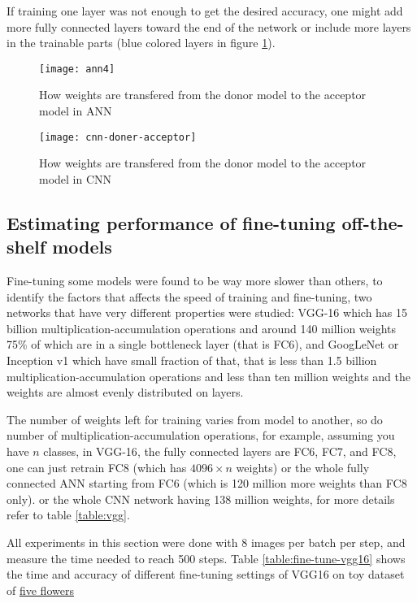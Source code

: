 If training one layer was not enough to get the desired accuracy,
one might add more fully connected layers toward the end of the network
or include more layers in the trainable parts (blue colored layers in figure \ref{fig:ann4}).

\begin{figure}[!h]
\centering
\texttt{[image: ann4]}
\caption{How weights are transfered from the donor model to the acceptor model in ANN}\label{fig:ann4}
\end{figure}


\begin{figure}[!h]
\centering
\texttt{[image: cnn-doner-acceptor]}
\caption{How weights are transfered from the donor model to the acceptor model in CNN}\label{fig:cnn-doner-acceptor}
\end{figure}

\subsection{Estimating performance of fine-tuning off-the-shelf models}


Fine-tuning some models were found to be way more slower than others,
to identify the factors that affects the speed of training and fine-tuning,
two networks that have very different properties were studied:
VGG-16\autocite{simonyan2014very} which has 15 billion multiplication-accumulation operations and around 140 million weights
75\% of which are in a single bottleneck layer (that is FC6), 
and GoogLeNet or Inception v1\autocite{szegedy2015going} which have small fraction of that, that is
less than 1.5 billion multiplication-accumulation operations and less than ten million weights
and the weights are almost evenly distributed on layers.

The number of weights left for training varies from model to another,
so do number of multiplication-accumulation operations, for example,
assuming you have \(n\) classes, in VGG-16\autocite{simonyan2014very},
the fully connected layers are FC6, FC7, and FC8,
one can just retrain FC8 (which has \(4096\times n\) weights)
or the whole fully connected ANN starting from FC6 (which is 120 million more weights than FC8 only).
or the whole CNN network having 138 million weights,
for more details refer to table \ref{table:vgg}.

All experiments in this section were done with 8 images per batch per step, and measure the time needed to reach 500 steps.
Table \ref{table:fine-tune-vgg16} shows the time and accuracy of different fine-tuning settings
of VGG16\autocite{simonyan2014very} on toy dataset of \href{http://download.tensorflow.org/example_images/flower_photos.tgz}{five flowers}

